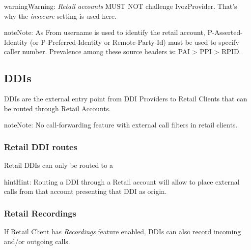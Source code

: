 \documentclass[letterpaper,10pt,english]{sphinxmanual}
\begin{document}
\begin{notice}{warning}{Warning:}
\emph{Retail accounts} MUST NOT challenge IvozProvider. That's
why the \emph{insecure} setting is used here.
\end{notice}

\begin{notice}{note}{Note:}
As From username is used to identify the retail account, P-Asserted-Identity (or P-Preferred-Identity or Remote-Party-Id) must be used to specify caller number.
Prevalence among these source headers is: PAI \textgreater{} PPI \textgreater{} RPID.
\end{notice}


\subsection{DDIs}
\label{administration_portal/client/retail/ddis:ddis}\label{administration_portal/client/retail/ddis::doc}\label{administration_portal/client/retail/ddis:retail-ddis}
DDIs are the external entry point from DDI Providers to Retail Clients that
can be routed through Retail Accounts.

\begin{notice}{note}{Note:}
No call-forwarding feature with external call filters in retail clients.
\end{notice}


\subsubsection{Retail DDI routes}
\label{administration_portal/client/retail/ddis:retail-ddi-routes}
Retail DDIs can only be routed to a {\hyperref[administration_portal/client/retail/retail_accounts:retail\string-accounts]{}}

\begin{notice}{hint}{Hint:}
Routing a DDI through a Retail account will allow to place external calls
from that account presenting that DDI as origin.
\end{notice}


\subsubsection{Retail Recordings}
\label{administration_portal/client/retail/ddis:retail-recordings}
If Retail Client has \emph{Recordings} feature enabled, DDIs can also record incoming and/or
outgoing calls.
\end{document}
